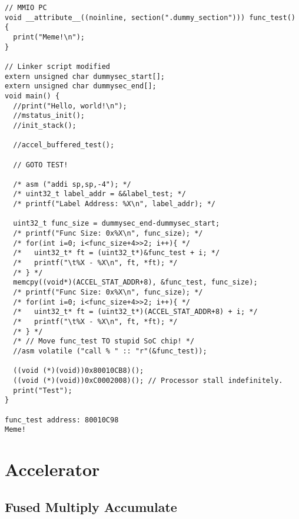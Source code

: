 \documentclass[a4paper,8pt]{report}
\begin{document}
\begin{verbatim}
// MMIO PC
void __attribute__((noinline, section(".dummy_section"))) func_test() {
  print("Meme!\n");
}

// Linker script modified
extern unsigned char dummysec_start[];
extern unsigned char dummysec_end[];
void main() {
  //print("Hello, world!\n");
  //mstatus_init();
  //init_stack();

  //accel_buffered_test();

  // GOTO TEST!

  /* asm ("addi sp,sp,-4"); */
  /* uint32_t label_addr = &&label_test; */
  /* printf("Label Address: %X\n", label_addr); */

  uint32_t func_size = dummysec_end-dummysec_start;
  /* printf("Func Size: 0x%X\n", func_size); */
  /* for(int i=0; i<func_size+4>>2; i++){ */
  /*   uint32_t* ft = (uint32_t*)&func_test + i; */
  /*   printf("\t%X - %X\n", ft, *ft); */
  /* } */
  memcpy((void*)(ACCEL_STAT_ADDR+8), &func_test, func_size);
  /* printf("Func Size: 0x%X\n", func_size); */
  /* for(int i=0; i<func_size+4>>2; i++){ */
  /*   uint32_t* ft = (uint32_t*)(ACCEL_STAT_ADDR+8) + i; */
  /*   printf("\t%X - %X\n", ft, *ft); */
  /* } */
  /* // Move func_test TO stupid SoC chip! */
  //asm volatile ("call % " :: "r"(&func_test));

  ((void (*)(void))0x80010CB8)();
  ((void (*)(void))0xC0002008)(); // Processor stall indefinitely.
  print("Test");
}

func_test address: 80010C98
Meme!
\end{verbatim}





\section{Accelerator}
\subsection{Fused Multiply Accumulate}


\end{document}

